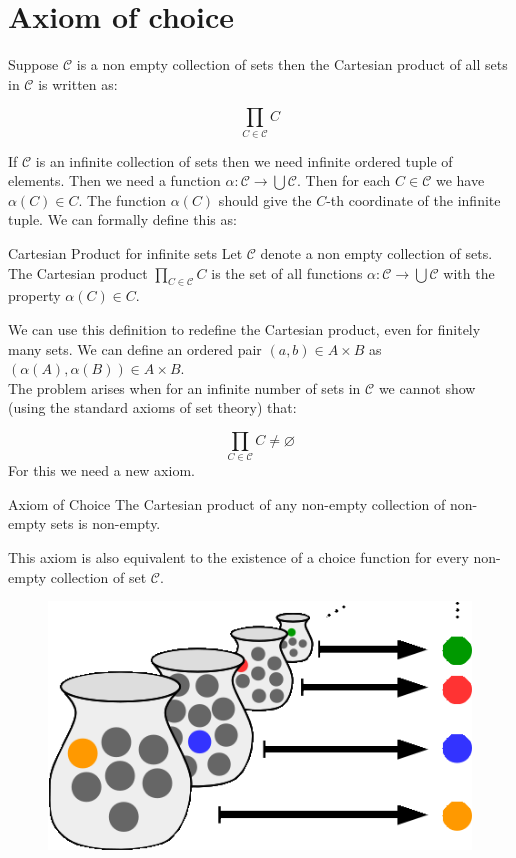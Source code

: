\documentclass[16pt,a4paper]{article}
\theoremstyle{definition}
\begin{document}
\newpage



\section{Axiom of choice}

Suppose $\mathcal{C}$ is a non empty collection of sets then the Cartesian product of all sets in $\mathcal{C}$ is written as:

\[\prod\limits_{C\in \mathcal{C}} C\] 

If $\mathcal{C}$ is an infinite collection of sets then we need infinite ordered tuple of elements. Then we need a function $\alpha : \mathcal{C} \rightarrow \bigcup \mathcal{C}$. Then for each $C\in \mathcal{C}$ we have $\alpha(C) \in C$. The function $\alpha (C)$ should give the $C$-th coordinate of the infinite tuple. We can formally define this as:\\

\begin{defn}{Cartesian Product for infinite sets}{}
Let $\mathcal{C}$ denote a non empty collection of sets. The Cartesian product $\prod\limits_{C\in \mathcal{C}}C$  is the set of all functions $\alpha : \mathcal{C} \rightarrow \bigcup \mathcal{C}$  with the property $\alpha(C) \in C$.
\end{defn} 

We can use this definition to redefine the Cartesian product, even for finitely many sets. We can define an ordered pair $(a,b) \in A\times B$ as $(\alpha(A), \alpha(B))\in A\times B$. \\
The problem arises when for an infinite number of sets in $\mathcal{C}$ we cannot show (using the standard axioms of set theory) that:

\[\prod_{C\in \mathcal{C}}C \neq \varnothing\]
For this we need a new axiom. 

\begin{axm}{Axiom of Choice}{}
The Cartesian product of any non-empty collection of non-empty sets is
non-empty.
\end{axm}
This axiom is also equivalent to the existence of a choice function for every non-empty collection of set $\mathcal{C}$.   

\begin{figure}[hbtp]

\centering
\includegraphics[scale=1]{figs/fig0.png}
\end{figure}
\end{document}
